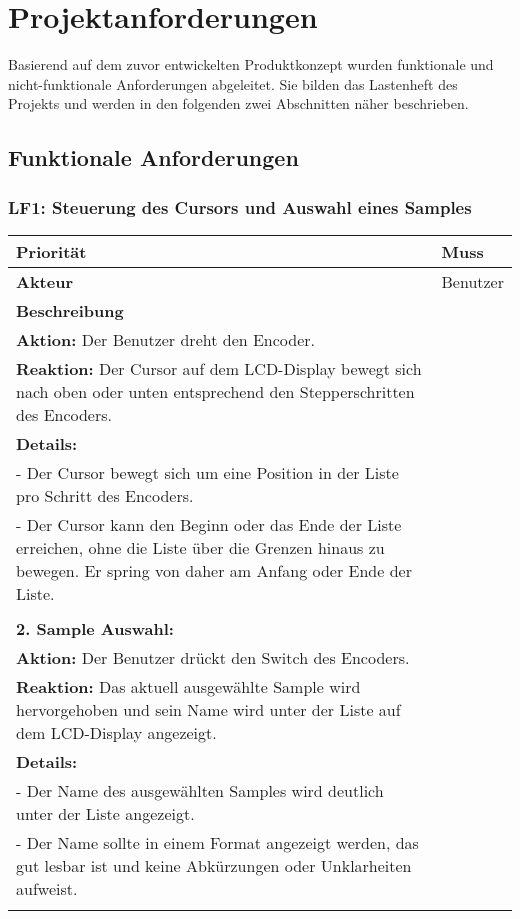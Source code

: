 \newpage
\section{Projektanforderungen}

Basierend auf dem zuvor entwickelten Produktkonzept wurden funktionale und nicht-funktionale Anforderungen abgeleitet. Sie bilden das Lastenheft des Projekts und werden in den folgenden zwei Abschnitten näher beschrieben.

\subsection{Funktionale Anforderungen}

\subsubsection{LF1: Steuerung des Cursors und Auswahl eines Samples}

\begin{longtable}[c]{|p{3cm}|p{13cm}|}
\hline
\textbf{Priorität} & Muss \\
\hline
\textbf{Akteur} & Benutzer \\
\hline
\textbf{Beschreibung} & 
\begin{tabularx}{13cm}{X}
\textbf{1. Cursor Bewegung:} \\
\textbf{Aktion:} Der Benutzer dreht den Encoder. \\
\textbf{Reaktion:} Der Cursor auf dem LCD-Display bewegt sich nach oben oder unten entsprechend den Stepperschritten des Encoders. \\
\textbf{Details:} \\
- Der Cursor bewegt sich um eine Position in der Liste pro Schritt des Encoders. \\
- Der Cursor kann den Beginn oder das Ende der Liste erreichen, ohne die Liste über die Grenzen hinaus zu bewegen. Er spring von daher am Anfang oder Ende der Liste. \\
\\
\textbf{2. Sample Auswahl:} \\
\textbf{Aktion:} Der Benutzer drückt den Switch des Encoders. \\
\textbf{Reaktion:} Das aktuell ausgewählte Sample wird hervorgehoben und sein Name wird unter der Liste auf dem LCD-Display angezeigt. \\
\textbf{Details:} \\
- Der Name des ausgewählten Samples wird deutlich unter der Liste angezeigt. \\
- Der Name sollte in einem Format angezeigt werden, das gut lesbar ist und keine Abkürzungen oder Unklarheiten aufweist. \\
\end{tabularx} \\
\hline
\end{longtable}

